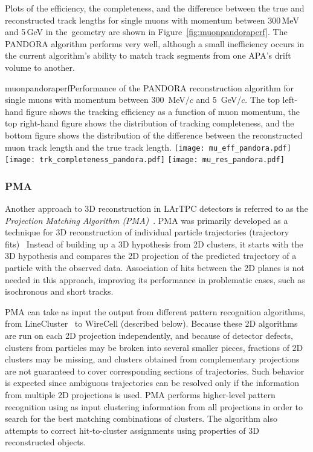 Plots of the efficiency, the completeness, and the  difference between the true and reconstructed
track lengths for single muons with momentum between 300\,MeV and 5\,GeV in the~\pdsp geometry are
shown in Figure~\ref{fig:muonpandoraperf}.  The PANDORA algorithm performs very well, although a small
inefficiency occurs in the current algorithm's ability to match track segments from one APA's drift volume to another.

\begin{cdrfigure}{muonpandoraperf}{Performance of the PANDORA reconstruction algorithm for single muons with 
momentum between 300~MeV$/c$ and 5~GeV/$c$.  The top left-hand figure shows the tracking efficiency as a function of
muon momentum, the top right-hand figure shows the distribution of tracking completeness, and the bottom figure shows the
distribution of the difference between the reconstructed muon track length and the true track length.}
\texttt{[image: mu\_eff\_pandora.pdf]}
\texttt{[image: trk\_completeness\_pandora.pdf]}
\texttt{[image: mu\_res\_pandora.pdf]}
\end{cdrfigure}


\subsubsection{PMA}

Another approach to 3D reconstruction in LArTPC detectors is referred to as the \textit{Projection Matching Algorithm
(PMA)}~\cite{pma_algorithm}. PMA was primarily developed as a technique for 3D reconstruction
of individual particle trajectories (trajectory fits)~\cite{pma_algorithm} %
Instead of
building up a 3D hypothesis from 2D clusters, it starts with the 3D hypothesis and compares
the 2D projection of the predicted trajectory of a particle with the observed data. Association
of hits between the 2D planes is not needed in this approach, improving its performance in
problematic cases, such as isochronous and short tracks.

PMA can take as input the output from different pattern recognition algorithms, from
LineCluster~\cite{linecluster} to WireCell (described below).  Because these 2D algorithms
are run on each 2D projection independently, and because of detector defects,
clusters from  particles may be broken
into several smaller pieces, fractions of 2D clusters may be missing,
and clusters obtained from complementary projections are not guaranteed to cover corresponding
sections of trajectories. Such behavior is expected since ambiguous 
trajectories can be resolved only if the information from multiple 2D projections is used.
PMA performs higher-level pattern recognition using as input clustering information from all
projections in order to search for the best matching combinations of clusters. The algorithm
also attempts to correct hit-to-cluster assignments using properties of 3D reconstructed objects.

